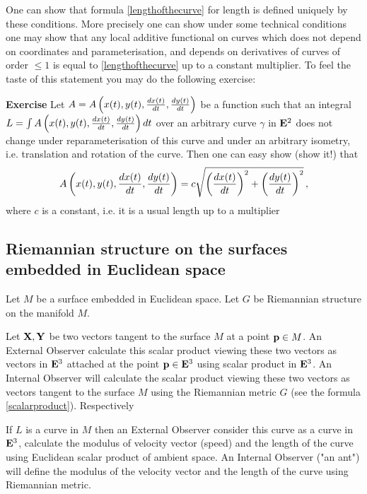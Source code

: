 \documentclass[12pt]{article}
\theoremstyle{theorem}
\numberwithin{equation}{section}
\begin{document}
{\footnotesize One can show that formula \eqref{lengthofthecurve}
for length is defined
uniquely by these conditions.
More precisely one can show under some technical conditions
one may show that any local additive functional on curves which does not
depend on coordinates and parameterisation, and depends on
derivatives of curves of order $\leq 1$  is equal
to \eqref{lengthofthecurve} up to a constant multiplier. To feel the taste of this statement
you may do the following exercise:

 {\bf Exercise} Let
$A=A\left(x(t), y(t),
 {dx(t)\over dt},{dy(t)\over dt}\right)$ be a function such that
an integral $L=\int A\left(x(t), y(t),
  {dx(t)\over dt},{dy(t)\over dt}\right)dt$ over an arbitrary curve
$\gamma$
in ${\bf E}^2$ does not change
under reparameterisation of this curve and under an arbitrary isometry,
i.e. translation and rotation of the curve.
Then one can easy show (show it!) that
        $$
   A\left(x(t), y(t),
 {dx(t)\over dt},{dy(t)\over dt}\right)=
  c\sqrt {\left({dx(t)\over dt}\right)^2+
   \left({dy(t)\over dt}\right)^2}\,,
    $$
where $c$ is a constant, i.e. it is a usual length up to a multiplier
}




\subsection{Riemannian structure on the surfaces embedded in Euclidean space}

Let $M$ be a surface embedded in Euclidean space. Let $G$ be Riemannian structure on the manifold $M$.

  Let ${\bf X}, {\bf Y}$ be two vectors tangent to the surface
$M$ at a point ${\bf p}\in M$. An External Observer calculate this scalar product viewing
these two vectors as vectors in ${\bf E}^3$ attached at the point ${\bf p}\in {\bf E}^3$
using scalar product in   ${\bf E}^3$.  An Internal Observer will calculate the scalar product
viewing these two vectors as vectors  tangent to the surface $M$
using the Riemannian
metric $G$ (see the formula \eqref{scalarproduct}).  Respectively


If $L$ is a curve in $M$ then an External Observer consider this curve as a curve in ${\bf E}^3$,
calculate the modulus of velocity  vector (speed) and the length of the curve using Euclidean scalar
product of ambient space. An Internal Observer ("an ant") will define the modulus of the velocity vector and
the length of the curve using Riemannian metric.
\end{document}
